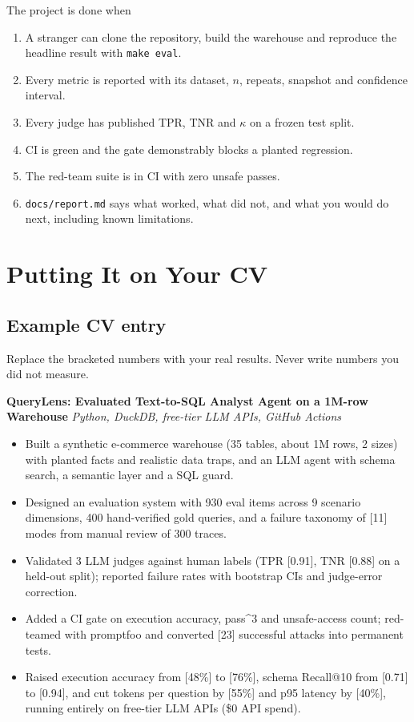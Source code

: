 \documentclass[11pt,a4paper]{article}
\newcommand{\code}[1]{\texttt{\small #1}}
\begin{document}
\begin{goodbox}{The project is done when}
\begin{enumerate}[leftmargin=*]
\item A stranger can clone the repository, build the warehouse and reproduce the headline result with \code{make eval}.
\item Every metric is reported with its dataset, $n$, repeats, snapshot and confidence interval.
\item Every judge has published TPR, TNR and $\kappa$ on a frozen test split.
\item CI is green and the gate demonstrably blocks a planted regression.
\item The red-team suite is in CI with zero unsafe passes.
\item \code{docs/report.md} says what worked, what did not, and what you would do next, including
known limitations.
\end{enumerate}
\end{goodbox}

\section{Putting It on Your CV}

\subsection{Example CV entry}

Replace the bracketed numbers with your real results. Never write numbers you did not measure.

\begin{plainbox}
\textbf{QueryLens: Evaluated Text-to-SQL Analyst Agent on a 1M-row Warehouse} \hfill \emph{Python, DuckDB, free-tier LLM APIs, GitHub Actions}
\begin{itemize}[leftmargin=*]
\item Built a synthetic e-commerce warehouse (35 tables, about 1M rows, 2 sizes) with planted
facts and realistic data traps, and an LLM agent with schema search, a semantic layer and a SQL guard.
\item Designed an evaluation system with 930 eval items across 9 scenario dimensions, 400
hand-verified gold queries, and a failure taxonomy of [11] modes from manual review of 300 traces.
\item Validated 3 LLM judges against human labels (TPR [0.91], TNR [0.88] on a held-out split);
reported failure rates with bootstrap CIs and judge-error correction.
\item Added a CI gate on execution accuracy, pass\^{}3 and unsafe-access count; red-teamed with
promptfoo and converted [23] successful attacks into permanent tests.
\item Raised execution accuracy from [48\%] to [76\%], schema Recall@10 from [0.71] to [0.94], and cut
tokens per question by [55\%] and p95 latency by [40\%], running entirely on free-tier LLM APIs (\$0 API spend).
\end{itemize}
\end{plainbox}
\end{document}
